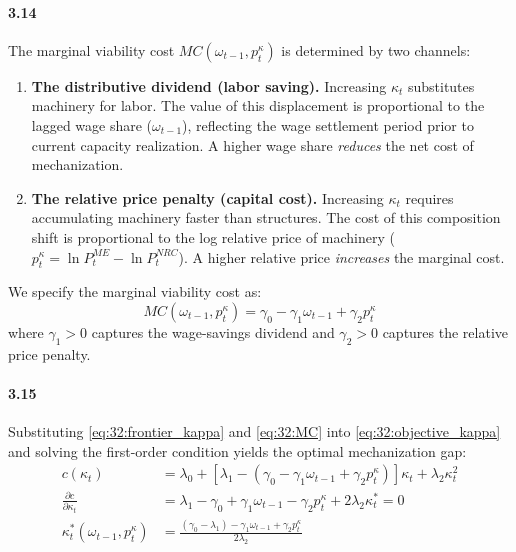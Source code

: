 \paragraph{3.14}
The marginal viability cost $MC(\omega_{t-1}, p^\kappa_t)$
is determined by two channels:
\begin{enumerate}
	\item \textbf{The distributive dividend (labor saving).}
	Increasing $\kappa_t$ substitutes machinery for labor. The
	value of this displacement is proportional to the lagged
	wage share ($\omega_{t-1}$), reflecting the wage
	settlement period prior to current capacity realization.
	A higher wage share \textit{reduces} the net cost of
	mechanization.
	\item \textbf{The relative price penalty (capital cost).}
	Increasing $\kappa_t$ requires accumulating machinery
	faster than structures. The cost of this composition shift
	is proportional to the log relative price of machinery
	($p^\kappa_t = \ln P^{ME}_t - \ln P^{NRC}_t$). A higher
	relative price \textit{increases} the marginal cost.
\end{enumerate}
We specify the marginal viability cost as:
\begin{equation}
	MC(\omega_{t-1}, p^\kappa_t)
	= \gamma_0 - \gamma_1 \omega_{t-1} + \gamma_2 p^\kappa_t
	\label{eq:32:MC}
\end{equation}
where $\gamma_1 > 0$ captures the wage-savings dividend and
$\gamma_2 > 0$ captures the relative price penalty.

\paragraph{3.15}
Substituting \eqref{eq:32:frontier_kappa} and
\eqref{eq:32:MC} into \eqref{eq:32:objective_kappa} and
solving the first-order condition yields the optimal
mechanization gap:
\begin{align}
	c(\kappa_t) &= \lambda_0
	+ \left[\lambda_1 - (\gamma_0 - \gamma_1 \omega_{t-1}
	+ \gamma_2 p^\kappa_t)\right] \kappa_t
	+ \lambda_2 \kappa_t^2
	\label{eq:32:unconstrained_kappa} \\
	\frac{\partial c}{\partial \kappa_t} &= \lambda_1 - \gamma_0
	+ \gamma_1 \omega_{t-1} - \gamma_2 p^\kappa_t
	+ 2\lambda_2 \kappa_t^* = 0
	\label{eq:32:foc_kappa} \\
	\kappa_t^*(\omega_{t-1}, p^\kappa_t)
	&= \frac{(\gamma_0 - \lambda_1) - \gamma_1 \omega_{t-1}
		+ \gamma_2 p^\kappa_t}{2\lambda_2}
	\label{eq:32:kappa_star}
\end{align}


